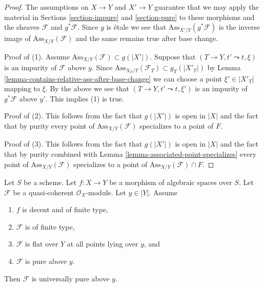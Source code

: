 \begin{proof}
The assumptions on $X \to Y$ and $X' \to Y$ guarantee that
we may apply the material in Sections \ref{section-impure} and
\ref{section-pure}
to these morphisms and the sheaves $\mathcal{F}$ and $g^*\mathcal{F}$.
Since $g$ is \'etale we see that
$\text{Ass}_{X'/Y}(g^*\mathcal{F})$
is the inverse image of $\text{Ass}_{X/Y}(\mathcal{F})$
and the same remains true after base change.

\medskip\noindent
Proof of (1). Assume $\text{Ass}_{X/Y}(\mathcal{F}) \subset g(|X'|)$.
Suppose that $(T \to Y, t' \leadsto t, \xi)$
is an impurity of $\mathcal{F}$ above $y$. Since
$\text{Ass}_{X_T/T}(\mathcal{F}_T) \subset g_T(|X'_T|)$ by
Lemma \ref{lemma-contains-relative-ass-after-base-change}
we can choose
a point $\xi' \in |X'_T|$ mapping to $\xi$. By the above we see
that $(T \to Y, t' \leadsto t, \xi')$ is an impurity of
$g^*\mathcal{F}$ above $y'$. This implies (1) is true.

\medskip\noindent
Proof of (2). This follows from the fact that $g(|X'|)$ is open
in $|X|$ and the fact that by purity every point of
$\text{Ass}_{X/Y}(\mathcal{F})$ specializes to a point of $F$.

\medskip\noindent
Proof of (3). This follows from the fact that $g(|X'|)$ is open
in $|X|$ and the fact that by purity combined with
Lemma \ref{lemma-associated-point-specializes} every point of
$\text{Ass}_{X/Y}(\mathcal{F})$ specializes to a point of
$\text{Ass}_{X/Y}(\mathcal{F}) \cap F$.
\end{proof}

\begin{lemma}
\label{lemma-finite-type-flat-pure-along-fibre-is-universal}
Let $S$ be a scheme. Let $f : X \to Y$ be a morphism of algebraic
spaces over $S$.
Let $\mathcal{F}$ be a quasi-coherent $\mathcal{O}_X$-module.
Let $y \in |Y|$.
Assume
\begin{enumerate}
\item $f$ is decent and of finite type,
\item $\mathcal{F}$ is of finite type,
\item $\mathcal{F}$ is flat over $Y$ at all points lying over $y$, and
\item $\mathcal{F}$ is pure above $y$.
\end{enumerate}
Then $\mathcal{F}$ is universally pure above $y$.
\end{lemma}

